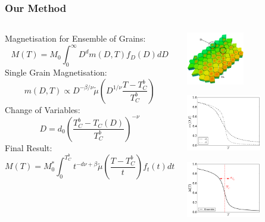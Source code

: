 \documentclass{beamer}
\begin{document}
\begin{frame}
	\frametitle{Our Method}
	\begin{columns}
	\column{8cm}
	\small{
	\newline
	Magnetisation for Ensemble of Grains:
	$$
	M(T) = M_0\int_0^\infty D^{d} m(D,T) f_D(D) dD
	$$
	Single Grain Magnetisation:
	$$
	m(D,T) \propto D^{-\beta/\nu} \tilde{\mu} \left(D^{1/\nu}\frac{T-T_C^b}{T_C^b}\right)
	$$
	Change of Variables:
	$$
	D = d_0\left(\frac{T_C^b - T_C(D)}{T_C^b}\right)^{-\nu} 
	$$
	Final Result:
	$$
	M(T) = M_0^*\int_0^{T_C^b} t^{-d\nu +\beta} \tilde{\mu}\left(\frac{T-T_C^b}{t}\right) f_t(t) dt
	$$}
	\column{4cm}
	\begin{center}
	\includegraphics[width=2.5cm]{Images/grains2}	
	
	\includegraphics[width=3.25cm]{Images/Ds_noinset}
	
	\includegraphics[width=3.25cm]{Images/Aggregate}
	\end{center}
	\end{columns}
\end{frame}
\end{document}
